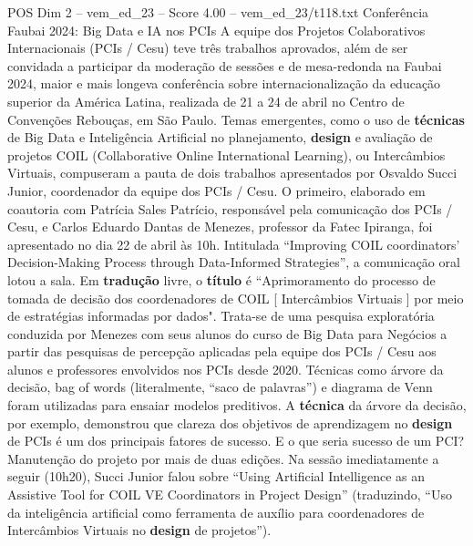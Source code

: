 \begin{textsample}{POS Dim 2 – vem\_ed\_23 – Score 4.00 – vem\_ed\_23/t118.txt}  \label{ex:f2_pos_111}
Conferência Faubai 2024: Big Data e IA nos PCIs A equipe dos Projetos Colaborativos Internacionais (PCIs / Cesu) teve três trabalhos aprovados, além de ser convidada a participar da moderação de sessões e de mesa-redonda na Faubai 2024, maior e mais longeva conferência sobre internacionalização da educação superior da América Latina, realizada de 21 a 24 de abril no Centro de Convenções Rebouças, em São Paulo.
Temas emergentes, como o uso de \textbf{técnicas} de Big Data e Inteligência Artificial no planejamento, \textbf{design} e avaliação de projetos COIL (Collaborative Online International Learning), ou Intercâmbios Virtuais, compuseram a pauta de dois trabalhos apresentados por Osvaldo Succi Junior, coordenador da equipe dos PCIs / Cesu.
O primeiro, elaborado em coautoria com Patrícia Sales Patrício, responsável pela comunicação dos PCIs / Cesu, e Carlos Eduardo Dantas de Menezes, professor da Fatec Ipiranga, foi apresentado no dia 22 de abril às 10h.
Intitulada “Improving COIL coordinators’ Decision-Making Process through Data-Informed Strategies”, a comunicação oral lotou a sala.
Em \textbf{tradução} livre, o \textbf{título} é “Aprimoramento do processo de tomada de decisão dos coordenadores de COIL [ Intercâmbios Virtuais ] por meio de estratégias informadas por dados".
Trata-se de uma pesquisa exploratória conduzida por Menezes com seus alunos do curso de Big Data para Negócios a partir das pesquisas de percepção aplicadas pela equipe dos PCIs / Cesu aos alunos e professores envolvidos nos PCIs desde 2020.
Técnicas como árvore da decisão, bag of words (literalmente, “saco de palavras”) e diagrama de Venn foram utilizadas para ensaiar modelos preditivos.
A \textbf{técnica} da árvore da decisão, por exemplo, demonstrou que clareza dos objetivos de aprendizagem no \textbf{design} de PCIs é um dos principais fatores de sucesso.
E o que seria sucesso de um PCI?
Manutenção do projeto por mais de duas edições.
Na sessão imediatamente a seguir (10h20), Succi Junior falou sobre “Using Artificial Intelligence as an Assistive Tool for COIL VE Coordinators in Project Design” (traduzindo, “Uso da inteligência artificial como ferramenta de auxílio para coordenadores de Intercâmbios Virtuais no \textbf{design} de projetos”).

\end{textsample}
